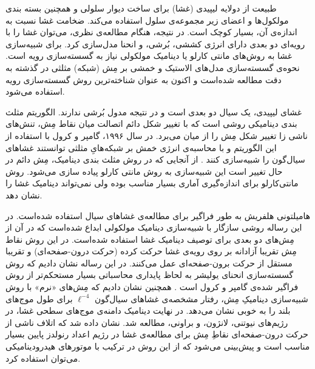 


طبیعت از دولایه‌ لیپیدی (غشا) برای ساخت دیوار سلولی و همچنین بسته بندی مولکول‌ها و اعضای زیر مجموعه‌ی سلول استفاده می‌کند. ضخامت غشا‌ نسبت به اندازه‌ی آن، بسیار کوچک است. در نتیجه، هنگام مطالعه‌ی نظری، می‌توان غشا را با رویه‌ای دو بعدی دارای انرژی کششی، بُرشی، و انحنا مدل‌سازی کرد. برای شبیه‌سازی غشا به روش‌های مانتی‌ کارلو یا دینامیک مولکولی نیاز به گسسته‌سازی رویه است. نحوه‌ی گسسته‌سازی مدل‌های الاستیک و خمشی بر مِش (شبکه‌) مثلثی در گذشته به دقت مطالعه شده‌است و اکنون به عنوان شناخته‌ترین روش گسسته‌سازی رویه‌ استفاده می‌شود.

غشای لیپیدی، یک سیال دو بعدی است و در نتیجه مدول بُرشی ندارند. ‌الگوریتم مثلث بندی دینامیکی روشی است که با تغییر شکل دائم اتصالت میان نقاط مِش، تنش‌های ناشی زا تغییر شکل مِش را  از میان می‌برد. در سال ۱۹۹۶، گامپر و کرول با استفاده از این الگوریتم و با محاسبه‌ی انرژی خمش بر شبکه‌هایِ مثلثی توانستند غشا‌های سیال‌گون را شبیه‌سازی کنند
\cite{gompper1996}.
 از آنجایی که در روش مثلث‌ بندی دینامیک، مِش دائم در حال تغییر است این شبیه‌سازی به روش مانتی کارلو پیاده سازی می‌شود. روش مانتی‌کارلو برای اندازه‌گیری آماری بسیار مناسب بوده ولی نمی‌تواند دینامیک غشا را نشان دهد.

هامیلتونی هلفریش به طور فراگیر برای مطالعه‌ی غشاهای سیال استفاده شده‌است. در این رساله روشی  سازگار با شبیه‌سازی دینامیک مولکولی ابداع شده‌است که در آن از مِش‌های دو بعدی برای توصیف دینامیک غشا استفاده شده‌است. در این روش نقاط مِش تقریبا آزادانه بر روی رویه‌ی غشا حرکت کرده (حرکت درون-صفحه‌ای) و تقریبا مستقل از حرکت برون-صفحه‌ای عمل می‌کنند. در این رساله نشان دادیم که روش گسسته‌سازی انحنای یولیشر 
\cite{Julicher1996}
به لحاظ پایداری محاسباتی بسیار مستحکم‌تر از روش فراگیر شده‌ی گامپر و کرول است
\cite{gompper1996}.
همچنین نشان دادیم که مِش‌های «نرم» با روش شبیه‌سازی دینامیکِ مِش، رفتار مشخصه‌ی غشا‌های سیال‌گون 
$\ell^{-4}$
برای طول موج‌های بلند را به خوبی نشان می‌دهد. در نهایت دینامیک دامنه‌ی موج‌های سطحی غشا، در رژیم‌های نیوتنی، لانژون، و براونی، مطالعه شد. نشان داده‌ شد که اتلاف ناشی از حرکت درون-صفحه‌ای نقاطِ مِش برای مطالعه‌ی غشا در رژیم اعداد رنولدز پایین بسیار مناسب است و پیش‌بینی می‌شود که از این روش در ترکیب با موتور‌های هیدرودینامیکی می‌توان استفاده کرد.


